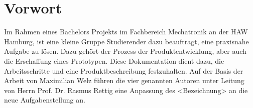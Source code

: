 \section{Vorwort}

Im Rahmen eines Bachelors Projekts im Fachbereich Mechatronik an der HAW Hamburg, ist eine kleine Gruppe Studierender dazu beauftragt, eine praxisnahe Aufgabe zu lösen. Dazu gehört der Prozess der Produktentwicklung, aber auch die Erschaffung eines Prototypen. Diese Dokumentation dient dazu, die Arbeitsschritte und eine Produktbeschreibung festzuhalten. Auf der Basis der Arbeit von Maximilian Welz führen die vier genannten Autoren unter Leitung von Herrn Prof. Dr. Rasmus Rettig eine Anpassung des <Bezeichnung> an die neue Aufgabenstellung an.
\newpage